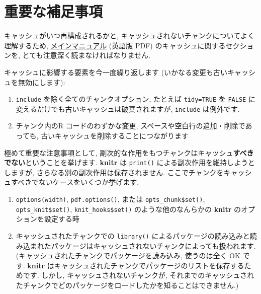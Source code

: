 \documentclass[
  lualatex,ja=standard,jafont=noto-otf]{bxjsreport}
\providecommand{\tightlist}{%
  \setlength{\itemsep}{0pt}\setlength{\parskip}{0pt}}
\begin{document}
\hypertarget{ux91cdux8981ux306aux88dcux8db3ux4e8bux9805}{%
\section*{重要な補足事項}\label{ux91cdux8981ux306aux88dcux8db3ux4e8bux9805}}

キャッシュがいつ再構成されるかと,
キャッシュされないチャンクについてよく理解するため,
\href{https://github.com/yihui/knitr/releases/download/doc/knitr-manual.pdf}{メインマニュアル}
(英語版 PDF) のキャッシュに関するセクションを,
とても注意深く読まなければなりません.

キャッシュに影響する要素を今一度繰り返します
(いかなる変更も古いキャッシュを無効にします):

\begin{enumerate}
\def\labelenumi{\arabic{enumi}.}
\tightlist
\item
  \texttt{include} を除く全てのチャンクオプション, たとえば
  \texttt{tidy=TRUE} を \texttt{FALSE}
  に変えるだけでも古いキャッシュは破棄されますが, \texttt{include}
  は例外です.
\item
  チャンク内のR コードのわずかな変更,
  スペースや空白行の追加・削除であっても,
  古いキャッシュを削除することにつながります
\end{enumerate}

極めて重要な注意事項として,
副次的な作用をもつチャンクはキャッシュ\textbf{すべきでない}ということを挙げます.
\textbf{knitr} は \texttt{print()} による副次作用を維持しようとしますが,
さらなる別の副次作用は保存されません.
ここでチャンクをキャッシュすべきでないケースをいくつか挙げます.

\begin{enumerate}
\def\labelenumi{\arabic{enumi}.}
\tightlist
\item
  \texttt{options(\textquotesingle{}width\textquotesingle{})},
  \texttt{pdf.options()}, または \texttt{opts\_chunk\$set()},
  \texttt{opts\_knit\$set()}, \texttt{knit\_hooks\$set()}
  のような他のなんらかの \textbf{knitr} のオプションを設定する時
\item
  キャッシュされたチャンクでの \texttt{library()}
  によるパッケージの読み込みと読み込まれたパッケージはキャッシュされないチャンクによっても扱われます.
  (キャッシュされたチャンクでパッケージを読み込み, 使うのは全く OK です.
  \textbf{knitr}
  はキャッシュされたチャンクでパッケージのリストを保存するためです.
  しかし, キャッシュされないチャンクが,
  それまでのキャッシュされたチャンクでどのパッケージをロードしたかを知ることはできません.)
\end{enumerate}
\end{document}
